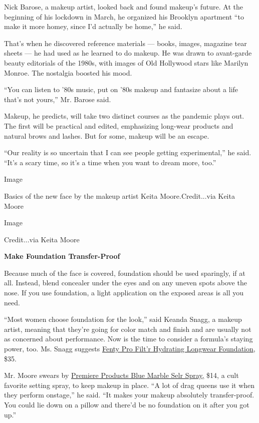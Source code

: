 Nick Barose, a makeup artist, looked back and found makeup's future. At
the beginning of his lockdown in March, he organized his Brooklyn
apartment ``to make it more homey, since I'd actually be home,'' he
said.

That's when he discovered reference materials --- books, images,
magazine tear sheets --- he had used as he learned to do makeup. He was
drawn to avant-garde beauty editorials of the 1980s, with images of Old
Hollywood stars like Marilyn Monroe. The nostalgia boosted his mood.

``You can listen to '80s music, put on '80s makeup and fantasize about a
life that's not yours,'' Mr. Barose said.

Makeup, he predicts, will take two distinct courses as the pandemic
plays out. The first will be practical and edited, emphasizing long-wear
products and natural brows and lashes. But for some, makeup will be an
escape.

``Our reality is so uncertain that I can see people getting
experimental,'' he said. ``It's a scary time, so it's a time when you
want to dream more, too.''

Image

Basics of the new face by the makeup artist Keita Moore.Credit...via
Keita Moore

Image

Credit...via Keita Moore

\textbf{Make Foundation Transfer-Proof}

Because much of the face is covered, foundation should be used
sparingly, if at all. Instead, blend concealer under the eyes and on any
uneven spots above the nose. If you use foundation, a light application
on the exposed areas is all you need.

``Most women choose foundation for the look,'' said Keanda Snagg, a
makeup artist, meaning that they're going for color match and finish and
are usually not as concerned about performance. Now is the time to
consider a formula's staying power, too. Ms. Snagg suggests
\href{https://www.fentybeauty.com/pro-filtr-hydrating-longwear-foundation/FB30020.html}{Fenty
Pro Filt'r Hydrating Longwear Foundation}, \$35.

Mr. Moore swears by
\href{https://www.ppipremiereproducts.com/products/blue-marble-selr}{Premiere
Products Blue Marble Selr Spray,} \$14, a cult favorite setting spray,
to keep makeup in place. ``A lot of drag queens use it when they perform
onstage,'' he said. ``It makes your makeup absolutely transfer-proof.
You could lie down on a pillow and there'd be no foundation on it after
you got up.''

